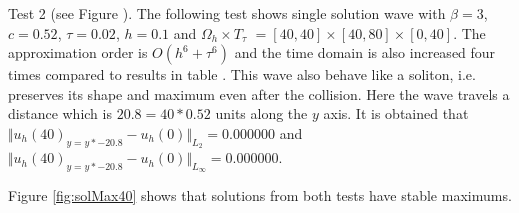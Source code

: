 \documentclass[11pt,a4paper,twoside]{article}
\begin{document}
\iffalse
Test 2 (see Figure ). The following test shows single solution wave with $\beta = 3$, $c = 0.52$, $\tau = 0.02$, $h = 0.1$ and $\Omega_h \times T_{\tau}$ $= [40, 40] \times [40, 80] \times [0, 40]$. The approximation order is $O(h^6 + \tau^6)$ and the time domain is also increased four times compared to results in table . This wave also behave like a soliton, i.e. preserves its shape and maximum even after the collision. Here the wave travels a distance which is $20.8 = 40*0.52$ units along the $y$ axis. It is obtained that $\Vert u_h(40)_{y = y*-20.8} - u_h(0) \Vert_{L_2} = 0.000000$ and $\Vert u_h(40)_{y = y*-20.8} - u_h(0) \Vert_{L_\infty} = 0.000000$.

Figure \ref{fig:solMax40} shows that solutions from both tests have stable maximums.
\end{document}
